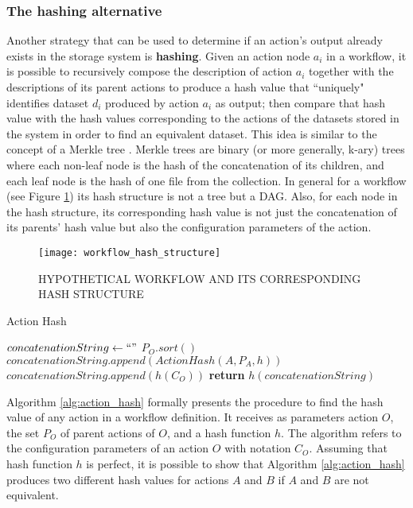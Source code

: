 \subsubsection{The hashing alternative}
\label{sec:encryption}
Another strategy that can be used to determine if an action's output already exists in the storage system is \textbf{hashing}.  Given an action node $a_i$ in a workflow, it is possible to recursively compose the description of action $a_i$ together with the descriptions of its parent actions to produce a hash value that ``uniquely" identifies dataset $d_i$ produced by action $a_i$ as output; then compare that hash value with the hash values corresponding to the actions of the datasets stored in the system in order to find an equivalent dataset. This idea is similar to the concept of a Merkle tree \citep{merkle1990certified}. Merkle trees are binary (or more generally, k-ary) trees where each non-leaf node is the hash of the concatenation of its children, and each leaf node is the hash of one file from the collection.  In general for a workflow (see Figure \ref{fig:hash_structure}) its hash structure is not a tree but a DAG.  Also, for each node in the hash structure, its corresponding hash value is not just the concatenation of its parents' hash value but also the configuration parameters of the action.  


\begin{figure}
\centering
\texttt{[image: workflow\_hash\_structure]}
\caption{HYPOTHETICAL WORKFLOW AND ITS CORRESPONDING HASH STRUCTURE}
\label{fig:hash_structure}
\end{figure}

\begin{algorithm}
\begin{singlespace}
\caption{Action Hash}
\label{alg:action_hash}
\begin{algorithmic}[1]
        \State $concatenationString \gets ``"$
        \State $P_O.sort()$
               \State $concatenationString.append(ActionHash(A, P_A, h))$
        \EndFor
        \State $concatenationString.append(h(C_O))$
        \State \textbf{return} $h(concatenationString)$
\EndProcedure
\end{algorithmic}
\end{singlespace}
\end{algorithm}

Algorithm \ref{alg:action_hash} formally presents the procedure to find the hash value of any action in a workflow definition. It receives as parameters action $O$, the set $P_O$ of parent actions of $O$, and a hash function $h$. The algorithm refers to the configuration parameters of an action $O$ with notation $C_O$. Assuming that hash function $h$ is perfect, it is possible to show that Algorithm \ref{alg:action_hash} produces two different hash values for actions $A$ and $B$ if $A$ and $B$ are not equivalent.  

